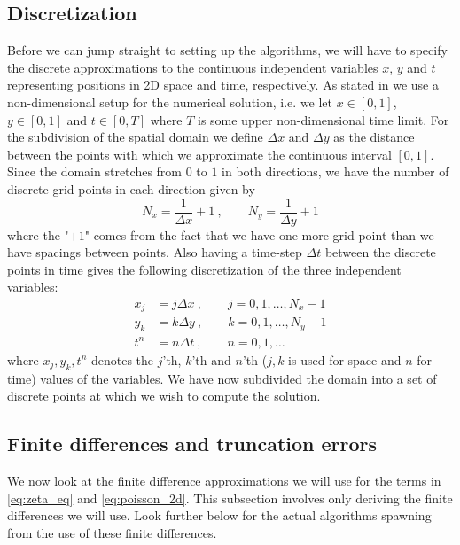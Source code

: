 \documentclass[12pt]{article}
\numberwithin{figure}{section}
\numberwithin{table}{section}
\begin{document}
\subsection{Discretization}
Before we can jump straight to setting up the algorithms, we will have to specify the discrete approximations to the continuous independent variables $x$, $y$ and $t$ representing positions in 2D space and time, respectively. As stated in \cite{pro5} we use a non-dimensional setup for the numerical solution, i.e. we let $x\in[0,1]$, $y\in[0,1]$ and $t\in[0, T]$ where $T$ is some upper non-dimensional time limit. For the subdivision of the spatial domain we define $\Delta x$ and $\Delta y$ as the distance between the points with which we approximate the continuous interval $[0,1]$. Since the domain stretches from $0$ to $1$ in both directions, we have the number of discrete grid points in each direction given by
\begin{equation}
	N_x=\frac{1}{\Delta x}+1 \ , \qquad N_y=\frac{1}{\Delta y}+1
\end{equation}
where the "$+1$" comes from the fact that we have one more grid point than we have spacings between points. Also having a time-step $\Delta t$ between the discrete points in time gives the following discretization of the three independent variables:
\begin{align}
	x_j&=j\Delta x \ , \qquad j=0,1,\dots,N_x-1 \nonumber\\
    y_k&=k\Delta y \ , \qquad k=0,1,\dots,N_y-1 \\
    t^n&=n\Delta t \ , \qquad n=0,1,\dots \nonumber
\end{align}
where $x_j,y_k,t^n$ denotes the $j$'th, $k$'th and $n$'th ($j,k$ is used for space and $n$ for time) values of the variables. We have now subdivided the domain into a set of discrete points at which we wish to compute the solution.

\subsection{Finite differences and truncation errors}
We now look at the finite difference approximations we will use for the terms in \eqref{eq:zeta_eq} and \eqref{eq:poisson_2d}. This subsection involves only deriving the finite differences we will use. Look further below for the actual algorithms spawning from the use of these finite differences. \\
\end{document}
